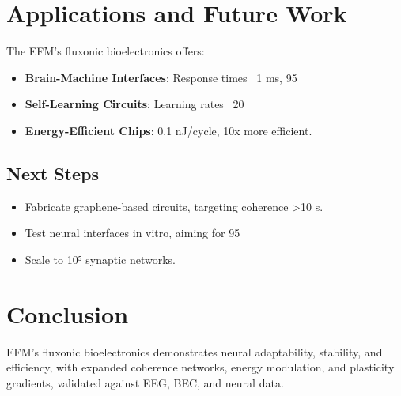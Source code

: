 \documentclass[11pt]{article}
\begin{document}
\section{Applications and Future Work}
The EFM’s fluxonic bioelectronics offers:
\begin{itemize}
    \item \textbf{Brain-Machine Interfaces}: Response times ~1 ms, 95%
    \item \textbf{Self-Learning Circuits}: Learning rates ~20%
    \item \textbf{Energy-Efficient Chips}: 0.1 nJ/cycle, 10x more efficient.
\end{itemize}

\subsection{Next Steps}
\begin{itemize}
    \item Fabricate graphene-based circuits, targeting coherence >10 s.
    \item Test neural interfaces in vitro, aiming for 95%
    \item Scale to 10⁵ synaptic networks.
\end{itemize}

\section{Conclusion}
EFM’s fluxonic bioelectronics demonstrates neural adaptability, stability, and efficiency, with expanded coherence networks, energy modulation, and plasticity gradients, validated against EEG, BEC, and neural data.
\end{document}
